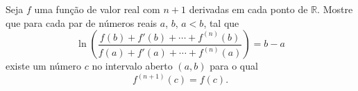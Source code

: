 Seja \(f\) uma função de valor real com \(n+1\) derivadas em cada ponto de \(\mathbb R\). Mostre que para cada par de números reais \(a\), \(b\), \(a<b\), tal que
\[
    \ln\left( \frac{f(b)+f'(b) + \cdots + f^{(n)} (b)}{f(a) + f'(a) + \cdots + f^{(n)}(a)}\right) = b-a
\]
existe um número \(c\) no intervalo aberto \((a,b)\) para o qual
\[
    f^{(n+1)}(c) = f(c).
\]
